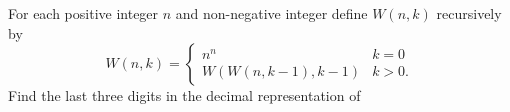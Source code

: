 For each positive integer $n$ and non-negative integer  define $W(n,k)$ recursively by
\[
W(n,k) = 
\begin{cases}
	n^n & k = 0 \\
	W(W(n,k-1), k-1) & k > 0.
\end{cases}
\]Find the last three digits in the decimal representation of 